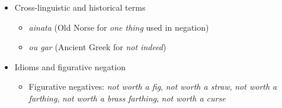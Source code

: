 \begin{itemize}[leftmargin=*]
    \item {Cross-linguistic and historical terms}
    \begin{itemize}
        \item \textit{ainata} (Old Norse for \textit{one thing} used in negation)
        \item \textit{ou gar} (Ancient Greek for \textit{not indeed})
    \end{itemize}

    \item {Idioms and figurative negation}
    \begin{itemize}
        \item Figurative negatives: \textit{not worth a fig}, \textit{not worth a straw}, \textit{not worth a farthing}, \textit{not worth a brass farthing}, \textit{not worth a curse}
    \end{itemize}
\end{itemize}
